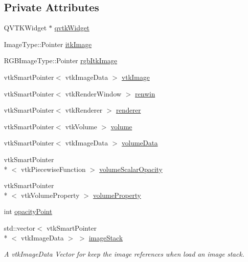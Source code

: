 \subsection*{Private Attributes}
\begin{DoxyCompactItemize}
\item 
Q\-V\-T\-K\-Widget $\ast$ \hyperlink{class_q_v_t_k_image_widget_a461f6ca20211ec9ff4b367aeb95e8139}{qvtk\-Widget}
\item 
Image\-Type\-::\-Pointer \hyperlink{class_q_v_t_k_image_widget_ae5b308466d4f198990b9d132319f9f34}{itk\-Image}
\item 
R\-G\-B\-Image\-Type\-::\-Pointer \hyperlink{class_q_v_t_k_image_widget_ae8cea614979ccdb6fe65551c8269b116}{rgb\-Itk\-Image}
\item 
vtk\-Smart\-Pointer$<$ vtk\-Image\-Data $>$ \hyperlink{class_q_v_t_k_image_widget_aa55aaf6e037ee4d789449ff3d365201b}{vtk\-Image}
\item 
vtk\-Smart\-Pointer$<$ vtk\-Render\-Window $>$ \hyperlink{class_q_v_t_k_image_widget_a1ffdb2716a14bd2cb4dc845c50fc474c}{renwin}
\item 
vtk\-Smart\-Pointer$<$ vtk\-Renderer $>$ \hyperlink{class_q_v_t_k_image_widget_a06c273e6e390e8e860fa4c0c932a2cf8}{renderer}
\item 
vtk\-Smart\-Pointer$<$ vtk\-Volume $>$ \hyperlink{class_q_v_t_k_image_widget_a37424d6e8fd36a77aa8ab79e4aee5acf}{volume}
\item 
vtk\-Smart\-Pointer$<$ vtk\-Image\-Data $>$ \hyperlink{class_q_v_t_k_image_widget_a5e2dcad8b7ea1a85c4b8052e9452844c}{volume\-Data}
\item 
vtk\-Smart\-Pointer\\*
$<$ vtk\-Piecewise\-Function $>$ \hyperlink{class_q_v_t_k_image_widget_afd1074dad297031f5f2171681b8c85fc}{volume\-Scalar\-Opacity}
\item 
vtk\-Smart\-Pointer\\*
$<$ vtk\-Volume\-Property $>$ \hyperlink{class_q_v_t_k_image_widget_ab354f6ff492086cf9abd53a371fa79f7}{volume\-Property}
\item 
int \hyperlink{class_q_v_t_k_image_widget_a70f1f3fa834da5feccd14b9373c3b2c0}{opacity\-Point}
\item 
std\-::vector$<$ vtk\-Smart\-Pointer\\*
$<$ vtk\-Image\-Data $>$ $>$ \hyperlink{class_q_v_t_k_image_widget_a336708e27578dab885b069f12c120138}{image\-Stack}
\begin{DoxyCompactList}\small\item\em A vtk\-Image\-Data Vector for keep the image references when load an image stack. \end{DoxyCompactList}\item 

\end{DoxyCompactItemize}
